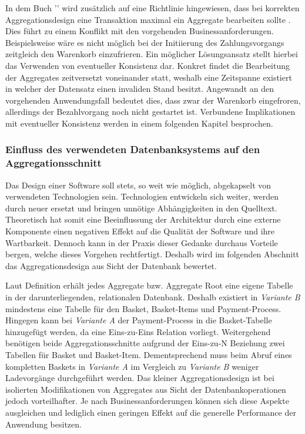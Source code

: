 In dem Buch '' wird zusätzlich auf eine Richtlinie hingewiesen, dass bei korrekten Aggregationsdesign eine Transaktion maximal ein Aggregate bearbeiten sollte \cite[S. 354]{Evans.2011}. Dies führt zu einem Konflikt mit den vorgehenden Businessanforderungen. Beispielsweise wäre es nicht möglich bei der Initiierung des Zahlungsvorgangs zeitgleich den Warenkorb einzufrieren. Ein möglicher Lösungsansatz stellt hierbei das Verwenden von eventueller Konsistenz dar. Konkret findet die Bearbeitung der Aggregates zeitversetzt voneinander statt, weshalb eine Zeitspanne existiert in welcher der Datensatz einen invaliden Stand besitzt. Angewandt an den vorgehenden Anwendungsfall bedeutet dies, dass zwar der Warenkorb eingefroren, allerdings der Bezahlvorgang noch nicht gestartet ist. Verbundene Implikationen mit eventueller Konsistenz werden in einem folgenden Kapitel besprochen.

\subsubsection{Einfluss des verwendeten Datenbanksystems auf den Aggregationsschnitt}

Das Design einer Software soll stets, so weit wie möglich, abgekapselt von verwendeten Technologien sein. Technologien entwickeln sich weiter, werden durch neuer ersetzt und bringen unnötige Abhängigkeiten in den Quelltext. Theoretisch hat somit eine Beeinflussung der Architektur durch eine externe Komponente einen negativen Effekt auf die Qualität der Software und ihre Wartbarkeit. Dennoch kann in der Praxis dieser Gedanke durchaus Vorteile bergen, welche dieses Vorgehen rechtfertigt. Deshalb wird im folgenden Abschnitt das Aggregationsdesign aus Sicht der Datenbank bewertet.

Laut Definition erhält jedes Aggregate bzw. Aggregate Root eine eigene Tabelle in der darunterliegenden, relationalen Datenbank. Deshalb existiert in \emph{Variante B} mindestens eine Tabelle für den Basket, Basket-Items und Payment-Process. Hingegen kann bei \emph{Variante A} der Payment-Process in die Basket-Tabelle hinzugefügt werden, da eine Eins-zu-Eins Relation vorliegt. Weitergehend benötigen beide Aggregationsschnitte aufgrund der Eins-zu-N Beziehung zwei Tabellen für Basket und Basket-Item. Dementsprechend muss beim Abruf eines kompletten Baskets in \emph{Variante A} im Vergleich zu \emph{Variante B} weniger Ladevorgänge durchgeführt werden. Das kleiner Aggregationsdesign ist bei isolierten Modifikationen von Aggregates aus Sicht der Datenbankoperationen jedoch vorteilhafter. Je nach Businessanforderungen können sich diese Aspekte ausgleichen und lediglich einen geringen Effekt auf die generelle Performance der Anwendung besitzen.

